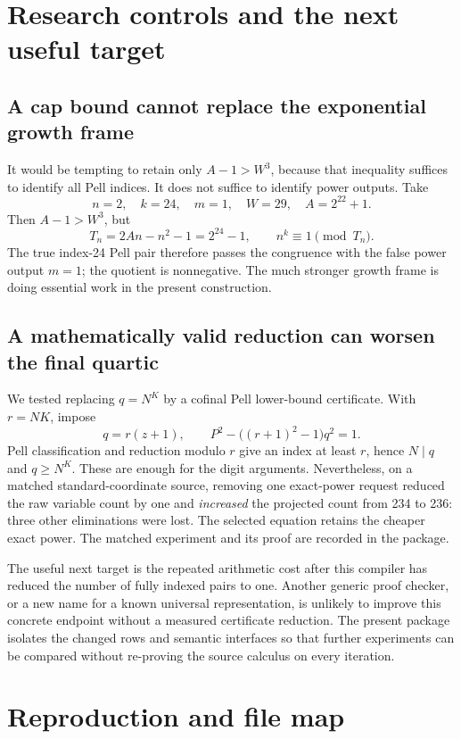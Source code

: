 \documentclass[11pt,a4paper]{article}
\theoremstyle{remark}
\begin{document}
\section{Research controls and the next useful target}

\subsection{A cap bound cannot replace the exponential growth frame}

It would be tempting to retain only \(A-1>W^3\), because that inequality
suffices to identify all Pell indices. It does not suffice to identify
power outputs. Take
\[
 n=2,\quad k=24,\quad m=1,\quad W=29,\quad A=2^{22}+1.
\]
Then \(A-1>W^3\), but
\[
 T_n=2An-n^2-1=2^{24}-1,\qquad n^k\equiv1\pmod{T_n}.
\]
The true index-24 Pell pair therefore passes the congruence with the false
power output \(m=1\); the quotient is nonnegative. The much stronger
growth frame is doing essential work in the present construction.

\subsection{A mathematically valid reduction can worsen the final quartic}

We tested replacing \(q=N^K\) by a cofinal Pell lower-bound certificate.
With \(r=NK\), impose
\[
 q=r(z+1),\qquad P^2-\big((r+1)^2-1\big)q^2=1.
\]
Pell classification and reduction modulo \(r\) give an index at least
\(r\), hence \(N\mid q\) and \(q\ge N^K\). These are enough for the
digit arguments. Nevertheless, on a matched standard-coordinate source,
removing one exact-power request reduced the raw variable count by one
and \emph{increased} the projected count from 234 to 236: three other
eliminations were lost. The selected equation retains the cheaper exact
power. The matched experiment and its proof are recorded in the package.

The useful next target is the repeated arithmetic cost after this compiler
has reduced the number of fully indexed pairs to one. Another generic proof
checker, or a new name for a known universal representation, is unlikely to
improve this concrete endpoint without a measured certificate reduction.
The present package isolates the changed rows and semantic interfaces so
that further experiments can be compared without re-proving the source
calculus on every iteration.

\section{Reproduction and file map}
\end{document}
